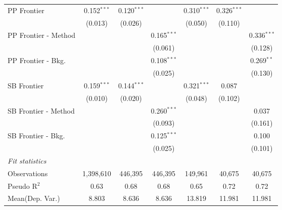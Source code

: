 \begin{tabular}{lcccccc}
   PP Frontier          & 0.152$^{***}$ & 0.120$^{***}$ &               & 0.310$^{***}$ & 0.326$^{***}$ &   \\   
                        & (0.013)       & (0.026)       &               & (0.050)       & (0.110)       &   \\   
   PP Frontier - Method &               &               & 0.165$^{***}$ &               &               & 0.336$^{***}$\\   
                        &               &               & (0.061)       &               &               & (0.128)\\   
   PP Frontier - Bkg.   &               &               & 0.108$^{***}$ &               &               & 0.269$^{**}$\\   
                        &               &               & (0.025)       &               &               & (0.130)\\   
   SB Frontier          & 0.159$^{***}$ & 0.144$^{***}$ &               & 0.321$^{***}$ & 0.087         &   \\   
                        & (0.010)       & (0.020)       &               & (0.048)       & (0.102)       &   \\   
   SB Frontier - Method &               &               & 0.260$^{***}$ &               &               & 0.037\\   
                        &               &               & (0.093)       &               &               & (0.161)\\   
   SB Frontier - Bkg.   &               &               & 0.125$^{***}$ &               &               & 0.100\\   
                        &               &               & (0.025)       &               &               & (0.101)\\   
   \midrule
   \emph{Fit statistics}\\
   Observations         & 1,398,610     & 446,395       & 446,395       & 149,961       & 40,675        & 40,675\\  
   Pseudo R$^2$         & 0.63          & 0.68          & 0.68          & 0.65          & 0.72          & 0.72\\  
Mean(Dep. Var.) & 8.803 & 8.636 & 8.636 & 13.819 & 11.981 & 11.981 \\
   

\end{tabular}
